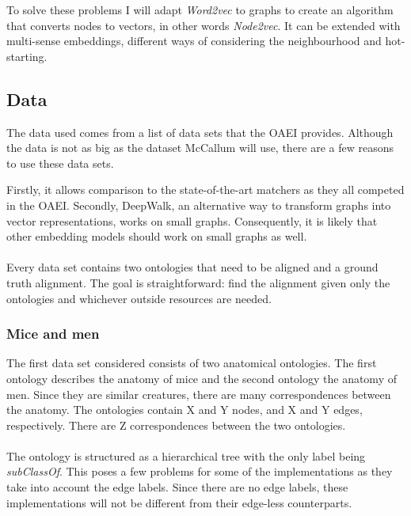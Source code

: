 \documentclass{article}
\begin{document}
 To solve these problems I will adapt \emph{Word2vec} to graphs to create an algorithm that converts nodes to vectors, in other words \emph{Node2vec}. It can be extended with multi-sense embeddings, different ways of considering the neighbourhood and hot-starting.
 
  \subsection{Data}
 The data used comes from a list of data sets that the OAEI provides\cite{euzenat2013ontology}. Although the data is not as big as the dataset McCallum will use, there are a few reasons to use these data sets.
 
 Firstly, it allows comparison to the state-of-the-art matchers as they all competed in the OAEI. Secondly, DeepWalk, an alternative way to transform graphs into vector representations, works on small graphs. Consequently, it is likely that other embedding models should work on small graphs as well.
 \paragraph{}
 Every data set contains two ontologies that need to be aligned and a ground truth alignment. The goal is straightforward: find the alignment given only the ontologies and whichever outside resources are needed.

 \subsubsection{Mice and men}
 The first data set considered consists of two anatomical ontologies. The first ontology describes the anatomy of mice and the second ontology the anatomy of men. Since they are similar creatures, there are many correspondences between the anatomy. The ontologies contain X and Y nodes, and X and Y edges, respectively. There are Z correspondences between the two ontologies.
 \paragraph{}
 The ontology is structured as a hierarchical tree with the only label being \emph{subClassOf}. This poses a few problems for some of the implementations as they take into account the edge labels. Since there are no edge labels, these implementations will not be different from their edge-less counterparts.
\end{document}
